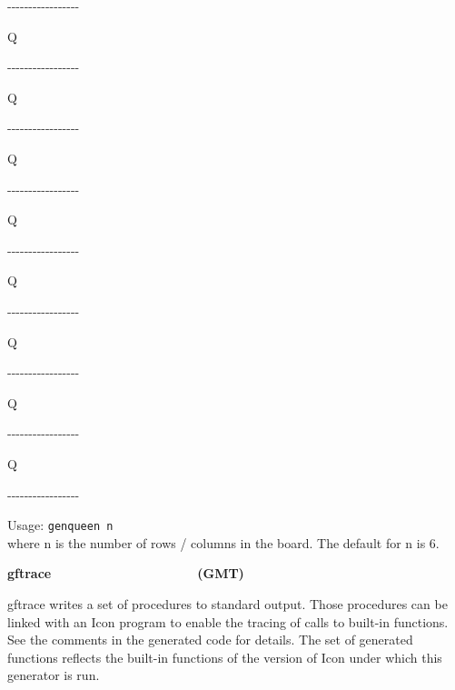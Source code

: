 {{\ttfamily
{}-{}-{}-{}-{}-{}-{}-{}-{}-{}-{}-{}-{}-{}-{}-{}-{}- }

{\ttfamily
{\textbar}Q{\textbar} {\textbar} {\textbar} {\textbar} {\textbar}
{\textbar} {\textbar} {\textbar}}

{\ttfamily
{}-{}-{}-{}-{}-{}-{}-{}-{}-{}-{}-{}-{}-{}-{}-{}-{}-}

{\ttfamily
{\textbar} {\textbar} {\textbar} {\textbar} {\textbar} {\textbar}
{\textbar}Q{\textbar} {\textbar}}

{\ttfamily
{}-{}-{}-{}-{}-{}-{}-{}-{}-{}-{}-{}-{}-{}-{}-{}-{}-}

{\ttfamily
{\textbar} {\textbar} {\textbar} {\textbar} {\textbar}Q{\textbar}
{\textbar} {\textbar} {\textbar}}

{\ttfamily
{}-{}-{}-{}-{}-{}-{}-{}-{}-{}-{}-{}-{}-{}-{}-{}-{}-}

{\ttfamily
{\textbar} {\textbar} {\textbar}{\textbar} {\textbar} {\textbar}
{\textbar} {\textbar}Q{\textbar}}

{\ttfamily
{}-{}-{}-{}-{}-{}-{}-{}-{}-{}-{}-{}-{}-{}-{}-{}-{}-}

{\ttfamily
{\textbar} {\textbar}Q{\textbar} {\textbar} {\textbar} {\textbar}
{\textbar} {\textbar} {\textbar}}

{\ttfamily
{}-{}-{}-{}-{}-{}-{}-{}-{}-{}-{}-{}-{}-{}-{}-{}-{}-}

{\ttfamily
{\textbar} {\textbar} {\textbar} {\textbar}Q{\textbar} {\textbar}
{\textbar} {\textbar} {\textbar}}

{\ttfamily
{}-{}-{}-{}-{}-{}-{}-{}-{}-{}-{}-{}-{}-{}-{}-{}-{}-}

{\ttfamily
{\textbar} {\textbar} {\textbar} {\textbar} {\textbar}
{\textbar}Q{\textbar} {\textbar} {\textbar}}

{\ttfamily
{}-{}-{}-{}-{}-{}-{}-{}-{}-{}-{}-{}-{}-{}-{}-{}-{}-}

{\ttfamily
{\textbar} {\textbar} {\textbar}Q{\textbar} {\textbar} {\textbar}
{\textbar} {\textbar} {\textbar}}

{\ttfamily
{}-{}-{}-{}-{}-{}-{}-{}-{}-{}-{}-{}-{}-{}-{}-{}-{}-}

Usage: \texttt{genqueen n\\
}where n is the number of rows / columns in the board. The default for n
is 6. 

{\sffamily\bfseries
gftrace\ \ \ \ \ \ \ \ \ \ \ \ \ \ \ \ \ \ \ \ (GMT)}

\textsf{gftrace} writes a set of procedures to standard output. Those
procedures can be linked with an Icon program to enable the
tracing of calls to built-in functions. See the comments
in the generated code for details. The set of generated functions
reflects the built-in functions of the version of Icon under which this
generator is run. 

}
